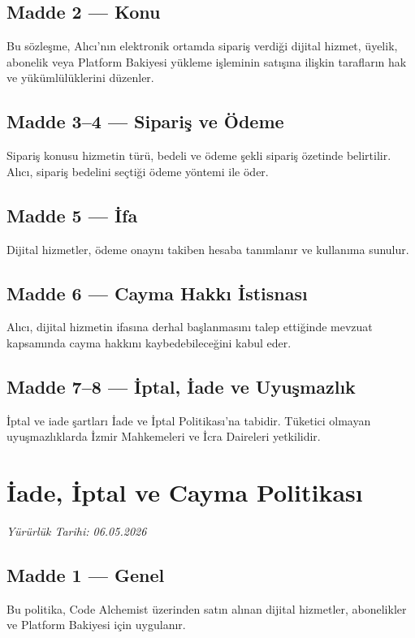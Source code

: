 \documentclass[12pt,a4paper]{article}
\begin{document}
\subsection*{Madde 2 --- Konu}
Bu s\"{o}zle\c{s}me, Al{\i}c{\i}'n{\i}n elektronik ortamda sipari\c{s} verdi\u{g}i dijital hizmet, \"{u}yelik,
abonelik veya Platform Bakiyesi y\"{u}kleme i\c{s}leminin sat{\i}\c{s}{\i}na ili\c{s}kin taraflar{\i}n hak
ve y\"{u}k\"{u}ml\"{u}l\"{u}klerini d\"{u}zenler.

\subsection*{Madde 3--4 --- Sipari\c{s} ve \"{O}deme}
Sipari\c{s} konusu hizmetin t\"{u}r\"{u}, bedeli ve ödeme \c{s}ekli sipari\c{s} \"{o}zetinde belirtilir.
Al{\i}c{\i}, sipari\c{s} bedelini se\c{c}ti\u{g}i \"{o}deme y\"{o}ntemi ile \"{o}der.

\subsection*{Madde 5 --- \.{I}fa}
Dijital hizmetler, \"{o}deme onayn{\i} takiben hesaba tan{\i}mlan{\i}r ve kullan{\i}ma sunulur.

\subsection*{Madde 6 --- Cayma Hakk{\i} \.{I}stisnas{\i}}
Al{\i}c{\i}, dijital hizmetin ifas{\i}na derhal ba\c{s}lanmas{\i}n{\i} talep etti\u{g}inde mevzuat kapsam{\i}nda
cayma hakk{\i}n{\i} kaybedebilece\u{g}ini kabul eder.

\subsection*{Madde 7--8 --- \.{I}ptal, \.{I}ade ve Uyu\c{s}mazl{\i}k}
\.{I}ptal ve iade \c{s}artlar{\i} \.{I}ade ve \.{I}ptal Politikas{\i}'na tabidir. T\"{u}ketici olmayan
uyu\c{s}mazl{\i}klarda \.{I}zmir Mahkemeleri ve \.{I}cra Daireleri yetkilidir.

\section{\.{I}ade, \.{I}ptal ve Cayma Politikas{\i}}
\textit{Y\"{u}r\"{u}rl\"{u}k Tarihi: 06.05.2026}

\subsection*{Madde 1 --- Genel}
Bu politika, Code Alchemist \"{u}zerinden sat{\i}n al{\i}nan dijital hizmetler, abonelikler ve
Platform Bakiyesi i\c{c}in uygulan{\i}r.
\end{document}

